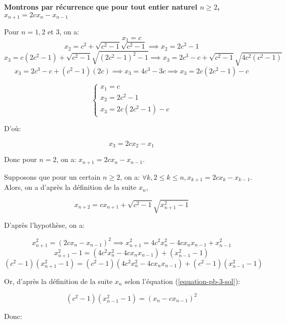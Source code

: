 \documentclass[12pt,a4paper,article]{memoir}
\begin{document}
\bigskip

\textbf{Montrons par récurrence que pour tout entier naturel $n \geq 2$, $x_{n+1} = 2cx_{n} - x_{n-1}$}

\bigskip

Pour $n = 1, 2$ et $3$, on a:
\[x_{1} = c \]
\[x_{2} = c^2 + \sqrt{c^2 - 1}\sqrt{c^2 - 1} \implies x_{2} = 2c^2 - 1 \]
\[x_{3} = c(2c^2 - 1) + \sqrt{c^2 - 1}\sqrt{(2c^2 -  1)^2 - 1} \implies x_{3} = 2c^3 - c + \sqrt{c^2 - 1}\sqrt{4c^2(c^2 - 1)} \]
\[x_{3} = 2c^3 - c + (c^2 - 1)(2c) \implies x_{3} = 4c^3 - 3c \implies x_{3} = 2c(2c^2 - 1) - c \]

\begin{equation}
\left\{
	\begin{array}{l}
	x_{1} = c\\
	x_{2} = 2c^2 - 1\\
	x_{3} = 2c(2c^2 - 1) - c
	\end{array}
\right.
\label{equation-pb-3-sol-2-x1x2x3}
\end{equation}

D'où:

\begin{equation}
x_{3} = 2cx_{2} - x_{1}
\label{equation-pb-3-sol-2-x3fctx1x2}
\end{equation}

Donc pour $n=2$, on a: $x_{n+1} = 2cx_{n} - x_{n-1}$.

\bigskip

Supposons que pour un certain $n \geq 2$, on a: $\forall k, 2 \leq k \leq n, x_{k+1} = 2cx_{k} - x_{k-1}$. Alors, on a d'après la définition de la suite $x_{n}$,

\begin{equation}
x_{n+2} = cx_{n+1} + \sqrt{c^2 - 1}\sqrt{x_{n+1}^2 - 1}
\label{equation-pb-3-sol-2-xnplustwofctxnplusone}
\end{equation}

D'après l'hypothèse, on a:

\[x_{n+1}^2 = (2cx_{n} - x_{n-1})^2 \implies x_{n+1}^2 = 4c^{2}x_{n}^{2} - 4cx_{n}x_{n-1} + x_{n-1}^{2} \]
\[x_{n+1}^2 - 1 = (4c^{2}x_{n}^{2} - 4cx_{n}x_{n-1}) + (x_{n-1}^{2} - 1) \]
\[(c^2 - 1)(x_{n+1}^2 - 1) = (c^{2} - 1)(4c^{2}x_{n}^{2} - 4cx_{n}x_{n-1}) + (c^{2} - 1)(x_{n-1}^{2} - 1) \]

Or, d'après la définition de la suite $x_{n}$ selon l'équation (\ref{equation-pb-3-sol}):

\[(c^{2} - 1)(x_{n-1}^{2} - 1) = (x_{n} - cx_{n-1})^{2} \]

Donc:
\end{document}

